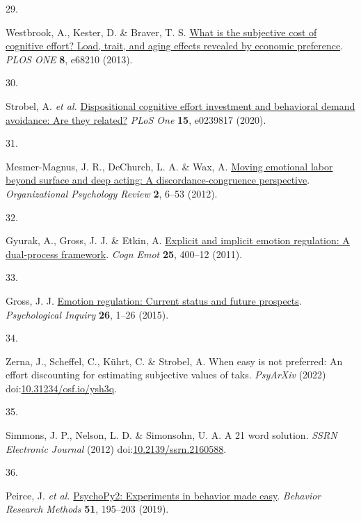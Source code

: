 \documentclass[
  man,floatsintext]{apa6}
\newlength{\cslhangindent}
\newlength{\csllabelwidth}
\newlength{\cslentryspacingunit} %
\newenvironment{CSLReferences}[2] %
 {%
  \setlength{\parindent}{0pt}
  \ifodd #1
  \let\oldpar\par
  \def\par{\hangindent=\cslhangindent\oldpar}
  \fi
  \setlength{\parskip}{#2\cslentryspacingunit}
 }%
 {}
\newcommand{\CSLLeftMargin}[1]{\parbox[t]{\csllabelwidth}{#1}}
\newcommand{\CSLRightInline}[1]{\parbox[t]{\linewidth - \csllabelwidth}{#1}\break}
\begin{document}
\begin{CSLReferences}{0}{0}
\leavevmode{}%
\CSLLeftMargin{29. }%
\CSLRightInline{Westbrook, A., Kester, D. \& Braver, T. S. \href{https://doi.org/10.1371/journal.pone.0068210}{What is the subjective cost of cognitive effort? {Load}, trait, and aging effects revealed by economic preference}. \emph{PLOS ONE} \textbf{8}, e68210 (2013).}

\leavevmode{}%
\CSLLeftMargin{30. }%
\CSLRightInline{Strobel, A. \emph{et al.} \href{https://doi.org/10.1371/journal.pone.0239817}{Dispositional cognitive effort investment and behavioral demand avoidance: Are they related?} \emph{PLoS One} \textbf{15}, e0239817 (2020).}

\leavevmode{}%
\CSLLeftMargin{31. }%
\CSLRightInline{Mesmer-Magnus, J. R., DeChurch, L. A. \& Wax, A. \href{https://doi.org/10.1177/2041386611417746}{Moving emotional labor beyond surface and deep acting: A discordance-congruence perspective}. \emph{Organizational Psychology Review} \textbf{2}, 6--53 (2012).}

\leavevmode{}%
\CSLLeftMargin{32. }%
\CSLRightInline{Gyurak, A., Gross, J. J. \& Etkin, A. \href{https://doi.org/10.1080/02699931.2010.544160}{Explicit and implicit emotion regulation: A dual-process framework}. \emph{Cogn Emot} \textbf{25}, 400--12 (2011).}

\leavevmode{}%
\CSLLeftMargin{33. }%
\CSLRightInline{Gross, J. J. \href{https://doi.org/10.1080/1047840x.2014.940781}{Emotion regulation: Current status and future prospects}. \emph{Psychological Inquiry} \textbf{26}, 1--26 (2015).}

\leavevmode{}%
\CSLLeftMargin{34. }%
\CSLRightInline{Zerna, J., Scheffel, C., Kührt, C. \& Strobel, A. When easy is not preferred: An effort discounting for estimating subjective values of taks. \emph{PsyArXiv} (2022) doi:\href{https://doi.org/10.31234/osf.io/ysh3q}{10.31234/osf.io/ysh3q}.}

\leavevmode{}%
\CSLLeftMargin{35. }%
\CSLRightInline{Simmons, J. P., Nelson, L. D. \& Simonsohn, U. A. A 21 word solution. \emph{SSRN Electronic Journal} (2012) doi:\href{https://doi.org/10.2139/ssrn.2160588}{10.2139/ssrn.2160588}.}

\leavevmode{}%
\CSLLeftMargin{36. }%
\CSLRightInline{Peirce, J. \emph{et al.} \href{https://doi.org/10.3758/s13428-018-01193-y}{{PsychoPy2}: {Experiments} in behavior made easy}. \emph{Behavior Research Methods} \textbf{51}, 195--203 (2019).}


\end{CSLReferences}
\end{document}
